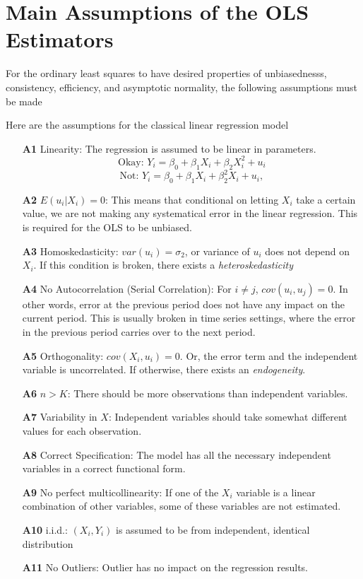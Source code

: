 

\section{Main Assumptions of the OLS Estimators}
For the ordinary least squares to have desired properties of unbiasednesss, consistency, efficiency, and asymptotic normality, the following assumptions must be made
\begin{mdframed}[backgroundcolor=blue!5] 
\begin{assumption} Here are the assumptions for the classical linear regression model
\begin{itemize}
\item[\textbf{A1}] Linearity: The regression is assumed to be linear in parameters.
\[
\text{Okay: } Y_i = \beta_0 + \beta_1X_i + \beta_2X_i^2+u_i 
\]
\[
\text{Not: } Y_i = \beta_0 + \beta_1X_i + \beta_2^2X_i+u_i,
\]

\item[\textbf{A2}] $E(u_i|X_i)=0$: This means that conditional on letting $X_i$ take a certain value, we are not making any systematical error in the linear regression. This is required for the OLS to be unbiased. 
\item[\textbf{A3}] Homoskedasticity: $var(u_i)=\sigma_2$, or variance of $u_i$ does not depend on $X_i$. If this condition is broken, there exists a \textit{heteroskedasticity}
\item[\textbf{A4}] No Autocorrelation (Serial Correlation): For $i\neq j$, $cov(u_i,u_j)=0$. In other words, error at the previous period does not have any impact on the current period. This is usually broken in time series settings, where the error in the previous period carries over to the next period.
\item[\textbf{A5}] Orthogonality: $cov(X_i,u_i)=0$. Or, the error term and the independent variable is uncorrelated. If otherwise, there exists an \textit{endogeneity}.

\item[\textbf{A6}] $n>K$: There should be more observations than independent variables.
\item[\textbf{A7}] Variability in $X$: Independent variables should take somewhat different values for each observation. 
\item[\textbf{A8}] Correct Specification: The model has all the necessary independent variables in a correct functional form.
\item[\textbf{A9}] No perfect multicollinearity: If one of the $X_i$ variable is a linear combination of other variables, some of these variables are not estimated.
\item[\textbf{A10}] i.i.d.: $(X_i,Y_i)$ is assumed to be from independent, identical distribution

\item[\textbf{A11}] No Outliers: Outlier has no impact on the regression results.



\end{itemize}
\end{assumption}
\end{mdframed}

